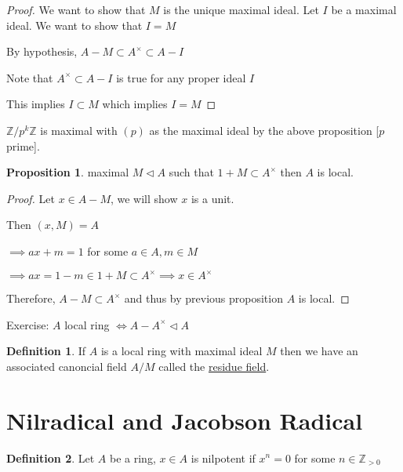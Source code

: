 \documentclass{article}
\theoremstyle{definition}
\newtheorem{definition}{Definition}
\newtheorem{proposition}{Proposition}
\begin{document}
\begin{proof}
    We want to show that \(M\) is the unique maximal ideal. Let \(I\) be a maximal ideal. We want to show that \(I = M\) 

    By hypothesis, \(A - M \subset A^\times \subset A - I\) 

    Note that \(A^\times \subset A - I\) is true for any proper ideal \(I\) 

    This implies \(I \subset M\) which implies \(I = M\) 

\end{proof}

\(\mathbb{Z} / p^k \mathbb{Z} \) is maximal with \((p)\) as the maximal ideal by the above proposition [\(p\) prime].

\begin{proposition}
    maximal \(M \triangleleft A\) such that \(1 + M \subset A^\times \) then \(A\) is local.
\end{proposition}

\begin{proof}
    Let \(x \in A - M\), we will show \(x\) is a unit.

    Then \((x,M) = A\) 

    \(\implies ax+m = 1\) for some \(a \in A, m \in M\) 

    \(\implies ax = 1 - m \in 1 + M \subset A^\times \implies x\in A^\times\) 

    Therefore, \(A - M \subset A^\times \) and thus by previous proposition \(A\) is local.

\end{proof}

Exercise: \(A\) local ring \(\iff A - A^\times \triangleleft A\) 

\begin{definition}
    If \(A\) is a local ring with maximal ideal \(M\) then we have an associated canoncial field \(A / M\) called the \underline{residue field}.
\end{definition}

\section*{Nilradical and Jacobson Radical}

\begin{definition}
    Let \(A\) be a ring, \(x \in A\) is nilpotent if \(x ^ n = 0\) for some \(n \in \mathbb{Z} _{>0}\) 
\end{definition}
\end{document}
